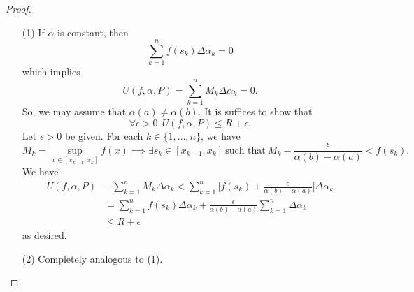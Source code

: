 \begin{proof}
\begin{enumerate}
    \item[(1)] If \(  \alpha \) is constant, then 
        \[  \sum_{ k=1  }^{ n } f({s}_{k}) \Delta {\alpha}_{k } = 0   \]
        which implies 
        \[  U(f,\alpha,P) = \sum_{ k=1  }^{ n } {M}_{k } \Delta {\alpha}_{k } = 0. \]
        So, we may assume that \( \alpha(a) \neq \alpha(b) \). It is suffices to show that 
        \[  \forall \epsilon > 0  \ \ U(f,\alpha, P) \leq R + \epsilon. \]
        Let \( \epsilon > 0  \) be given. For each \( k \in \{ 1, \dots, n \}  \), we have
        \[  {M}_{k } = \sup_{x \in [{x}_{k-1}, {x}_{k}]} f(x) \implies \exists {s}_{k } \in [{x}_{k-1}, {x}_{k}] \ \text{such that} \ {M}_{k }  - \frac{ \epsilon }{  \alpha(b) - \alpha(a) } < f({s}_{k}). \]
        We have
        \begin{align*}
            U(f,\alpha,P) &- \sum_{ k=1  }^{ n } {M}_{k } \Delta  {\alpha}_{k } < \sum_{ k=1  }^{ n } \Big[f({s}_{k}) + \frac{ \epsilon }{  \alpha(b) - \alpha(a) } \Big] \Delta {\alpha}_{k } \\
                          &= \sum_{ k=1  }^{ n } f({s}_{k}) \Delta {\alpha}_{k } + \frac{ \epsilon }{  \alpha(b) - \alpha(a) }  \sum_{ k=1 }^{ n  } \Delta {\alpha}_{k }  \\
                          &\leq R + \epsilon
        \end{align*}
        as desired.
    \item[(2)] Completely analogous to (1).
\end{enumerate}
\end{proof}

